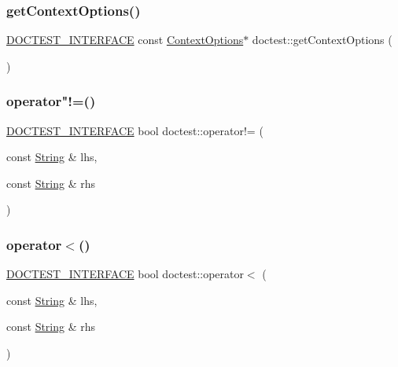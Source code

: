 \subsubsection{\texorpdfstring{get\+Context\+Options()}{getContextOptions()}}
{\footnotesize\ttfamily \mbox{\hyperlink{doctest_8h_a9c16ffc635ec47f07797d21ede26b1a5}{D\+O\+C\+T\+E\+S\+T\+\_\+\+I\+N\+T\+E\+R\+F\+A\+CE}} const \mbox{\hyperlink{structdoctest_1_1_context_options}{Context\+Options}}$\ast$ doctest\+::get\+Context\+Options (\begin{DoxyParamCaption}{ }\end{DoxyParamCaption})}

\mbox{\label{namespacedoctest_ab9a88e4c19857cd86a0f037d27bcad72}} 
\subsubsection{\texorpdfstring{operator"!=()}{operator!=()}}
{\footnotesize\ttfamily \mbox{\hyperlink{doctest_8h_a9c16ffc635ec47f07797d21ede26b1a5}{D\+O\+C\+T\+E\+S\+T\+\_\+\+I\+N\+T\+E\+R\+F\+A\+CE}} bool doctest\+::operator!= (\begin{DoxyParamCaption}\item[{const \mbox{\hyperlink{classdoctest_1_1_string}{String}} \&}]{lhs,  }\item[{const \mbox{\hyperlink{classdoctest_1_1_string}{String}} \&}]{rhs }\end{DoxyParamCaption})}

\mbox{\label{namespacedoctest_afa15b277b9a277793b7adf129e0128d9}} 
\subsubsection{\texorpdfstring{operator$<$()}{operator<()}}
{\footnotesize\ttfamily \mbox{\hyperlink{doctest_8h_a9c16ffc635ec47f07797d21ede26b1a5}{D\+O\+C\+T\+E\+S\+T\+\_\+\+I\+N\+T\+E\+R\+F\+A\+CE}} bool doctest\+::operator$<$ (\begin{DoxyParamCaption}\item[{const \mbox{\hyperlink{classdoctest_1_1_string}{String}} \&}]{lhs,  }\item[{const \mbox{\hyperlink{classdoctest_1_1_string}{String}} \&}]{rhs }\end{DoxyParamCaption})}

